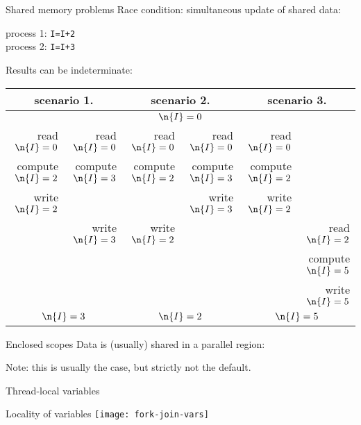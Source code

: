 \begin{exerciseframe}
  
\end{exerciseframe}

\begin{numberedframe}{Shared memory problems}
Race condition: simultaneous update of shared data:
\begin{tabbing}
  process 1: \texttt{I=I+2}\\
  process 2: \texttt{I=I+3}
\end{tabbing}
Results can be indeterminate:

\tiny
\begin{tabular}{|rr|rr|rr|}
  \hline
  \multicolumn{2}{|c|}{scenario 1.}& \multicolumn{2}{|c|}{scenario 2.}&
  \multicolumn{2}{|c|}{scenario 3.}\\ \hline
  \multicolumn{6}{|c|}{$\n{I}=0$}\\ \hline
  read $\n{I}=0$&read $\n{I}=0$&
    read $\n{I}=0$&read $\n{I}=0$&
      read $\n{I}=0$& \\
  compute $\n{I}=2$&compute $\n{I}=3$& 
    compute $\n{I}=2$&compute $\n{I}=3$&
      compute $\n{I}=2$& \\
  write $\n{I}=2$& & &write $\n{I}=3$&write $\n{I}=2$& \\
  &write $\n{I}=3$&write $\n{I}=2$& & &read $\n{I}=2$\\
  &&&&&compute $\n{I}=5$\\
  &&&&&write $\n{I}=5$\\
  \hline
  \multicolumn{2}{|c|}{$\n{I}=3$}& \multicolumn{2}{|c|}{$\n{I}=2$}&
  \multicolumn{2}{|c|}{$\n{I}=5$}\\ \hline
\end{tabular}
\end{numberedframe}

\begin{numberedframe}{Enclosed scopes}
  Data is (usually) shared in a parallel region:
  
  Note: this is usually the case,
  but strictly not the default.
\end{numberedframe}

\begin{numberedframe}{Thread-local variables}
  
\end{numberedframe}

\begin{numberedframe}{Locality of variables}
  \texttt{[image: fork-join-vars]}
\end{numberedframe}

